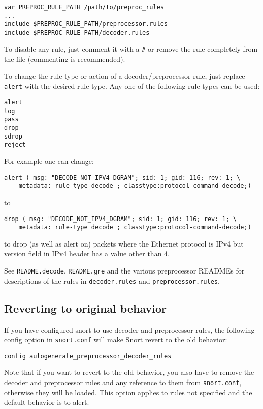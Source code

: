 \documentclass[english]{report}
\begin{document}
\begin{verbatim}
var PREPROC_RULE_PATH /path/to/preproc_rules
...
include $PREPROC_RULE_PATH/preprocessor.rules
include $PREPROC_RULE_PATH/decoder.rules
\end{verbatim}

To disable any rule, just comment it with a \texttt{\#} or remove the rule
completely from the file (commenting is recommended).

To change the rule type or action of a decoder/preprocessor rule,
just replace \texttt{alert} with the desired rule type.  Any one of the
following rule types can be used:

\begin{verbatim}
alert
log
pass
drop
sdrop
reject
\end{verbatim}

For example one can change:

\begin{verbatim}
alert ( msg: "DECODE_NOT_IPV4_DGRAM"; sid: 1; gid: 116; rev: 1; \
    metadata: rule-type decode ; classtype:protocol-command-decode;)
\end{verbatim}

to

\begin{verbatim}
drop ( msg: "DECODE_NOT_IPV4_DGRAM"; sid: 1; gid: 116; rev: 1; \
    metadata: rule-type decode ; classtype:protocol-command-decode;)
\end{verbatim}

to drop (as well as alert on) packets where the Ethernet protocol is IPv4
but version field in IPv4 header has a value other than 4.

See \texttt{README.decode}, \texttt{README.gre} and the various preprocessor READMEs for
descriptions of the rules in \texttt{decoder.rules} and \texttt{preprocessor.rules}.


\subsection{Reverting to original behavior}
If you have configured snort to use decoder and preprocessor rules, the 
following config option in \texttt{snort.conf} will make Snort revert to the old
behavior:

\begin{verbatim}
config autogenerate_preprocessor_decoder_rules
\end{verbatim}

Note that if you want to revert to the old behavior, you also have to
remove the decoder and preprocessor rules and any reference to them from
\texttt{snort.conf}, otherwise they will be loaded.  This option applies to rules
not specified and the default behavior is to alert.
\end{document}
